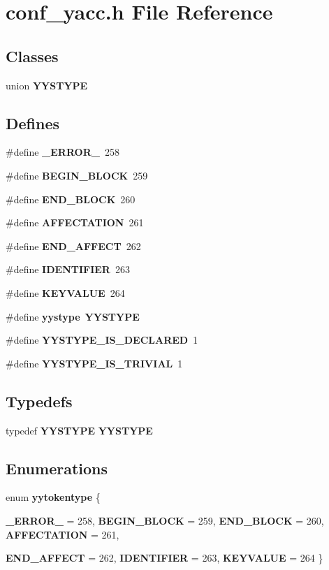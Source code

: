 \section{conf\_\-yacc.h File Reference}
\label{conf__yacc_8h}
\subsection*{Classes}
\begin{CompactItemize}
\item 
union {\bf YYSTYPE}
\end{CompactItemize}
\subsection*{Defines}
\begin{CompactItemize}
\item 
\#define {\bf \_\-ERROR\_\-}\ 258
\item 
\#define {\bf BEGIN\_\-BLOCK}\ 259
\item 
\#define {\bf END\_\-BLOCK}\ 260
\item 
\#define {\bf AFFECTATION}\ 261
\item 
\#define {\bf END\_\-AFFECT}\ 262
\item 
\#define {\bf IDENTIFIER}\ 263
\item 
\#define {\bf KEYVALUE}\ 264
\item 
\#define {\bf yystype}\ {\bf YYSTYPE}
\item 
\#define {\bf YYSTYPE\_\-IS\_\-DECLARED}\ 1
\item 
\#define {\bf YYSTYPE\_\-IS\_\-TRIVIAL}\ 1
\end{CompactItemize}
\subsection*{Typedefs}
\begin{CompactItemize}
\item 
typedef {\bf YYSTYPE} {\bf YYSTYPE}
\end{CompactItemize}
\subsection*{Enumerations}
\begin{CompactItemize}
\item 
enum {\bf yytokentype} \{ \par
{\bf \_\-ERROR\_\-} =  258, 
{\bf BEGIN\_\-BLOCK} =  259, 
{\bf END\_\-BLOCK} =  260, 
{\bf AFFECTATION} =  261, 
\par
{\bf END\_\-AFFECT} =  262, 
{\bf IDENTIFIER} =  263, 
{\bf KEYVALUE} =  264
 \}
\end{CompactItemize}
